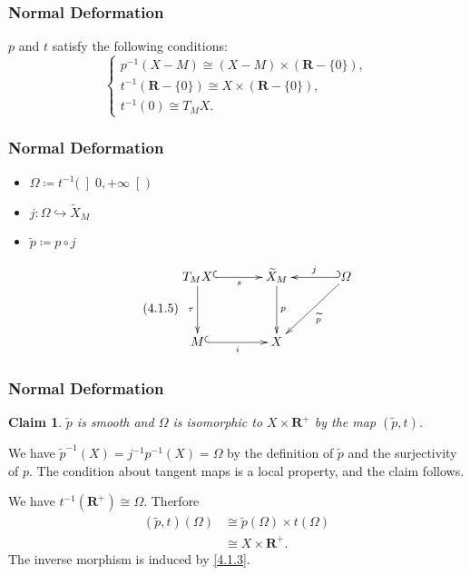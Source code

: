 \documentclass[dvipdfmx,12pt,aspectratio=169,leqno]{beamer}%
\makeatletter
\newcommand{\rr}{\mathbf{R}}
\renewenvironment{proof}[1][\proofname]{\par
  \pushQED{\qed}%
  \normalfont \topsep6\p@\@plus6\p@\relax
  \trivlist
  \item[\hskip\labelsep
         \bfseries
    {#1}]\ignorespaces
}{%
  \popQED\endtrivlist\@endpefalse
}
\renewcommand{\proofname}{\textrm{Proof.}}
\numberwithin{equation}{subsection}
\theoremstyle{mystyle}
\newtheorem{CLM}[AXM]{Claim}
\makeatother
\begin{document}
\begin{frame}
    \frametitle{Normal Deformation}

    \(p\) and \(t\) satisfy the following conditions:
    \begin{equation}\tag{4.1.3}\label{4.1.3}
        \begin{cases}
            p^{-1}(X-M)\cong (X-M)\times (\rr-\{0\}),\\
            t^{-1}(\rr-\{0\})\cong X\times (\rr-\{0\}),\\
            t^{-1}(0)\cong T_{M}X.
        \end{cases}
    \end{equation}
\end{frame}


\begin{frame}
    \frametitle{Normal Deformation}

    \begin{itemize}
        \item \(\varOmega\coloneqq t^{-1}\big({\left]0,+\infty\right[}\big)\)
        \item \(j\colon\varOmega\hookrightarrow \widetilde{X}_{M}\)
        \item \(\widetilde{p}\coloneqq p\circ j\)
    \end{itemize}
    \begin{equation}\tag{4.1.5}\label{4.1.5}
        \vcenter{\xymatrix@C=36pt@R=36pt{
        T_{M}X
        \ar[d]_-{\tau}
        \ar@{^{(}->}[r]_-{s}
        &
        \widetilde{X}_{M}
        \ar[d]^-{p}
        &
        \varOmega
        \ar@{_{(}->}[l]_-{j}
        \ar[ld]^-{\widetilde{p}}
        \\
        M
        \ar@{^{(}->}[r]_-{i}
        &
        X
      }}
    \end{equation}
\end{frame}

\begin{frame}
    \frametitle{Normal Deformation}
    \begin{CLM}
        \(\widetilde{p}\) is smooth 
        and 
        \(\varOmega\) is isomorphic to \(X\times \rr^{+}\) 
        by the map \(\left(\widetilde{p},t\right)\).
    \end{CLM}
    \begin{proof}
        We have \(
            \widetilde{p}^{-1}(X)
            =j^{-1}p^{-1}(X)
            =\varOmega
        \) by the definition of \(\widetilde{p}\) and 
        the surjectivity of \(p\). 
        The condition about tangent maps is a local property, 
        and the claim follows.

        We have \(t^{-1}(\rr^{+})\cong\varOmega\). Therfore
        \begin{align*}
            \left(\widetilde{p},t\right)(\varOmega)
            &\cong \widetilde{p}(\varOmega)\times t(\varOmega)\\
            &\cong X\times \rr^{+}.
        \end{align*}
        The inverse morphism is induced by \eqref{4.1.3}.
    \end{proof}
\end{frame}
\end{document}
